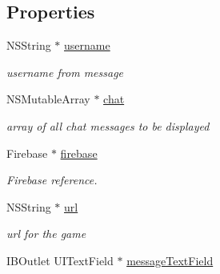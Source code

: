 \subsection*{Properties}
\begin{DoxyCompactItemize}
\item 
\hypertarget{interface_chat_view_controller_ad56977780e52390de9421a468bc70ea9}{N\+S\+String $\ast$ \hyperlink{interface_chat_view_controller_ad56977780e52390de9421a468bc70ea9}{username}}\label{interface_chat_view_controller_ad56977780e52390de9421a468bc70ea9}

\begin{DoxyCompactList}\small\item\em username from message \end{DoxyCompactList}\item 
\hypertarget{interface_chat_view_controller_a7047db5531de8c6429e3f5d1711b7ec7}{N\+S\+Mutable\+Array $\ast$ \hyperlink{interface_chat_view_controller_a7047db5531de8c6429e3f5d1711b7ec7}{chat}}\label{interface_chat_view_controller_a7047db5531de8c6429e3f5d1711b7ec7}

\begin{DoxyCompactList}\small\item\em array of all chat messages to be displayed \end{DoxyCompactList}\item 
\hypertarget{interface_chat_view_controller_a3b9e9efbf61a8d78859d18324e70fba3}{Firebase $\ast$ \hyperlink{interface_chat_view_controller_a3b9e9efbf61a8d78859d18324e70fba3}{firebase}}\label{interface_chat_view_controller_a3b9e9efbf61a8d78859d18324e70fba3}

\begin{DoxyCompactList}\small\item\em Firebase reference. \end{DoxyCompactList}\item 
\hypertarget{interface_chat_view_controller_a4f67d7dd32711c6c2d1609c676538e1e}{N\+S\+String $\ast$ \hyperlink{interface_chat_view_controller_a4f67d7dd32711c6c2d1609c676538e1e}{url}}\label{interface_chat_view_controller_a4f67d7dd32711c6c2d1609c676538e1e}

\begin{DoxyCompactList}\small\item\em url for the game \end{DoxyCompactList}\item 
\hypertarget{interface_chat_view_controller_a03aa767959b30a2cc48bca8afde5f6db}{I\+B\+Outlet U\+I\+Text\+Field $\ast$ \hyperlink{interface_chat_view_controller_a03aa767959b30a2cc48bca8afde5f6db}{message\+Text\+Field}}\label{interface_chat_view_controller_a03aa767959b30a2cc48bca8afde5f6db}


\end{DoxyCompactItemize}

